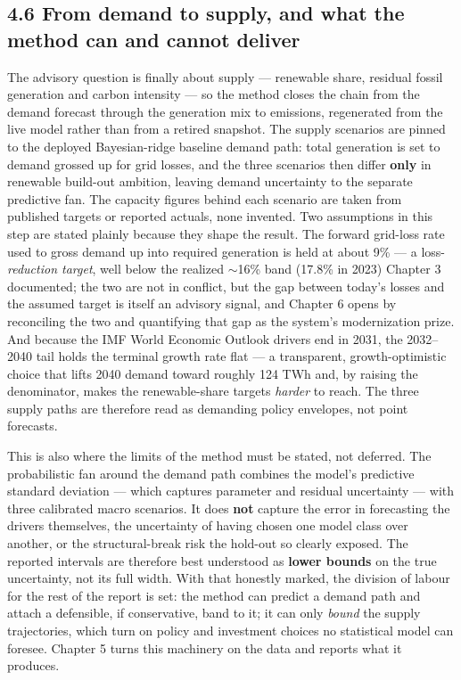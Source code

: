 \documentclass[10pt,twocolumn]{article}
\begin{document}
\subsection*{4.6 From demand to supply, and what the method can and cannot deliver}

The advisory question is finally about supply --- renewable share, residual fossil generation and carbon intensity --- so the method closes the chain from the demand forecast through the generation mix to emissions, regenerated from the live model rather than from a retired snapshot. The supply scenarios are pinned to the deployed Bayesian-ridge baseline demand path: total generation is set to demand grossed up for grid losses, and the three scenarios then differ \textbf{only} in renewable build-out ambition, leaving demand uncertainty to the separate predictive fan. The capacity figures behind each scenario are taken from published targets or reported actuals, none invented. Two assumptions in this step are stated plainly because they shape the result. The forward grid-loss rate used to gross demand up into required generation is held at about 9\% --- a loss-\textit{reduction target}, well below the realized $\sim$16\% band (17.8\% in 2023) Chapter 3 documented; the two are not in conflict, but the gap between today's losses and the assumed target is itself an advisory signal, and Chapter 6 opens by reconciling the two and quantifying that gap as the system's modernization prize. And because the IMF World Economic Outlook drivers end in 2031, the 2032--2040 tail holds the terminal growth rate flat --- a transparent, growth-optimistic choice that lifts 2040 demand toward roughly 124 TWh and, by raising the denominator, makes the renewable-share targets \textit{harder} to reach. The three supply paths are therefore read as demanding policy envelopes, not point forecasts.

This is also where the limits of the method must be stated, not deferred. The probabilistic fan around the demand path combines the model's predictive standard deviation --- which captures parameter and residual uncertainty --- with three calibrated macro scenarios. It does \textbf{not} capture the error in forecasting the drivers themselves, the uncertainty of having chosen one model class over another, or the structural-break risk the hold-out so clearly exposed. The reported intervals are therefore best understood as \textbf{lower bounds} on the true uncertainty, not its full width. With that honestly marked, the division of labour for the rest of the report is set: the method can predict a demand path and attach a defensible, if conservative, band to it; it can only \textit{bound} the supply trajectories, which turn on policy and investment choices no statistical model can foresee. Chapter 5 turns this machinery on the data and reports what it produces.
\end{document}
